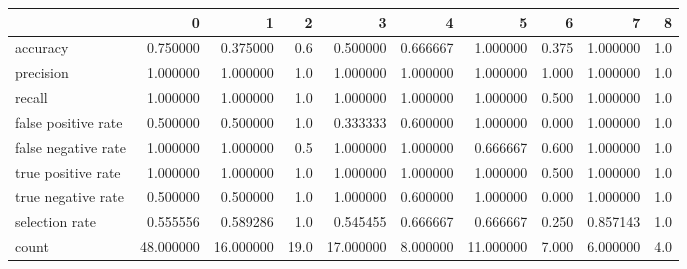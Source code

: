 \begin{tabular}{lrrrrrrrrr}
\toprule
{} &          0 &          1 &     2 &          3 &         4 &          5 &      6 &         7 &    8 \\
\midrule
accuracy            &   0.750000 &   0.375000 &   0.6 &   0.500000 &  0.666667 &   1.000000 &  0.375 &  1.000000 &  1.0 \\
precision           &   1.000000 &   1.000000 &   1.0 &   1.000000 &  1.000000 &   1.000000 &  1.000 &  1.000000 &  1.0 \\
recall              &   1.000000 &   1.000000 &   1.0 &   1.000000 &  1.000000 &   1.000000 &  0.500 &  1.000000 &  1.0 \\
false positive rate &   0.500000 &   0.500000 &   1.0 &   0.333333 &  0.600000 &   1.000000 &  0.000 &  1.000000 &  1.0 \\
false negative rate &   1.000000 &   1.000000 &   0.5 &   1.000000 &  1.000000 &   0.666667 &  0.600 &  1.000000 &  1.0 \\
true positive rate  &   1.000000 &   1.000000 &   1.0 &   1.000000 &  1.000000 &   1.000000 &  0.500 &  1.000000 &  1.0 \\
true negative rate  &   0.500000 &   0.500000 &   1.0 &   1.000000 &  0.600000 &   1.000000 &  0.000 &  1.000000 &  1.0 \\
selection rate      &   0.555556 &   0.589286 &   1.0 &   0.545455 &  0.666667 &   0.666667 &  0.250 &  0.857143 &  1.0 \\
count               &  48.000000 &  16.000000 &  19.0 &  17.000000 &  8.000000 &  11.000000 &  7.000 &  6.000000 &  4.0 \\
\bottomrule
\end{tabular}

